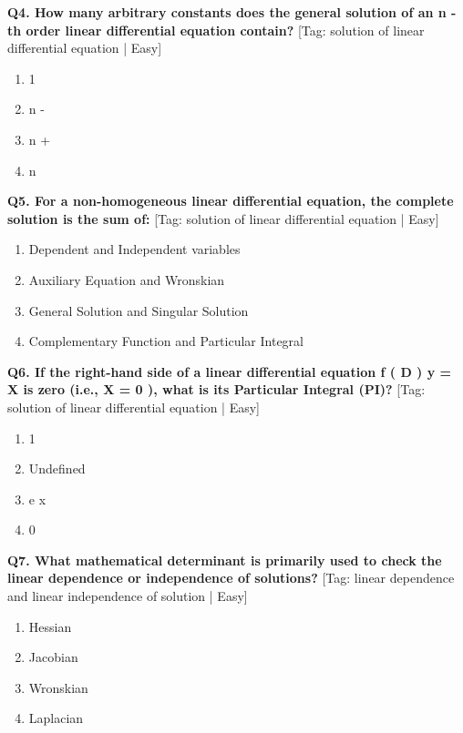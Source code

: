 \noindent\textbf{Q4. How many arbitrary constants does the general solution of an n -th order linear differential equation contain?} \hfill [Tag: solution of linear differential equation | Easy]
\begin{enumerate}[label=(\alph*),topsep=2pt,itemsep=1pt,partopsep=0pt,parsep=0pt]
    \item {{1}}
    \item {{n -}}
    \item {{n +}}
    \item {{n}}
\end{enumerate}
\vspace{2mm}

\noindent\textbf{Q5. For a non-homogeneous linear differential equation, the complete solution is the sum of:} \hfill [Tag: solution of linear differential equation | Easy]
\begin{enumerate}[label=(\alph*),topsep=2pt,itemsep=1pt,partopsep=0pt,parsep=0pt]
    \item {{Dependent and Independent variables}}
    \item {{Auxiliary Equation and Wronskian}}
    \item {{General Solution and Singular Solution}}
    \item {{Complementary Function and Particular Integral}}
\end{enumerate}
\vspace{2mm}

\noindent\textbf{Q6. If the right-hand side of a linear differential equation f ( D ) y = X is zero (i.e., X = 0 ), what is its Particular Integral (PI)?} \hfill [Tag: solution of linear differential equation | Easy]
\begin{enumerate}[label=(\alph*),topsep=2pt,itemsep=1pt,partopsep=0pt,parsep=0pt]
    \item {{1}}
    \item {{Undefined}}
    \item {{e x}}
    \item {{0}}
\end{enumerate}
\vspace{2mm}

\noindent\textbf{Q7. What mathematical determinant is primarily used to check the linear dependence or independence of solutions?} \hfill [Tag: linear dependence and linear independence of solution | Easy]
\begin{enumerate}[label=(\alph*),topsep=2pt,itemsep=1pt,partopsep=0pt,parsep=0pt]
    \item {{Hessian}}
    \item {{Jacobian}}
    \item {{Wronskian}}
    \item {{Laplacian}}
\end{enumerate}
\vspace{2mm}

